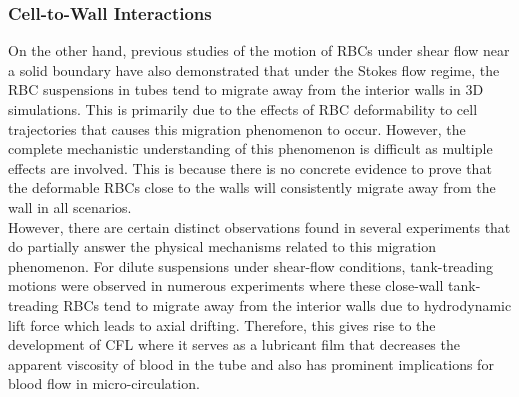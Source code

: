 \subsubsection{Cell-to-Wall Interactions}
\noindent On the other hand, previous studies of the motion of RBCs under shear flow near a solid boundary have also demonstrated that under the Stokes flow regime, the RBC suspensions in tubes tend to migrate away from the interior walls in 3D simulations.\cite{CoupierG2008Nlmo, DoddiSaiK2009Tcmo} This is primarily due to the effects of RBC deformability to cell trajectories that causes this migration phenomenon to occur\cite{PhysRevLett}. However, the complete mechanistic understanding of this phenomenon is difficult as multiple effects are involved. This is because there is no concrete evidence to prove that the deformable RBCs close to the walls will consistently migrate away from the wall in all scenarios. \\

\noindent However, there are certain distinct observations found in several experiments that do partially answer the physical mechanisms related to this migration phenomenon. For dilute suspensions under shear-flow conditions, tank-treading motions were observed in numerous experiments where these close-wall tank- treading RBCs tend to migrate away from the interior walls due to hydrodynamic lift force which leads to axial drifting.\cite{Olla_1997A, Olla_1997B, PhysRevLett.83.876, PhysRevLett2002, PhysRevLett} Therefore, this gives rise to the development of CFL where it serves as a lubricant film that decreases the apparent viscosity of blood in the tube and also has prominent implications for blood flow in micro-circulation.\cite{feng_weinbaum_2000, CharlesPhDThesis2020}





